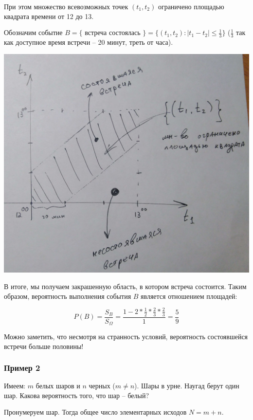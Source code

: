 \documentclass{article}
\begin{document}
При этом множество всевозможных точек $(t_1, t_2)$ ограничено площадью квадрата времени от 12 до 13.

Обозначим событие $B = \{$ встреча состоялась $\} = \{(t_1, t_2) : |t_1 - t_2| \leq \frac{1}{3}\}$ ($\frac{1}{3}$ так как доступное время встречи -- 20 минут, треть от часа).

\begin{center}
    \includegraphics[scale=0.2]{1_2.jpg}
\end{center}

В итоге, мы получаем закрашенную область, в котором встреча состоится. Таким образом, вероятность выполнения события $B$ является отношением площадей:

$$P(B) = \frac{S_B}{S_{\Omega}} = \frac{1 - 2 * \frac{1}{2} * \frac{2}{3} * \frac{2}{3}}{1} = \frac{5}{9} $$

Можно заметить, что несмотря на странность условий, вероятность состоявшейся встречи больше половины!

\subsubsection{Пример 2}

Имеем: $m$ белых шаров и $n$ черных ($m \neq n$). Шары в урне.
Наугад берут один шар. Какова вероятность того, что шар -- белый?

Пронумеруем шар. Тогда общее число элементарных исходов $N = m + n$.
\end{document}
